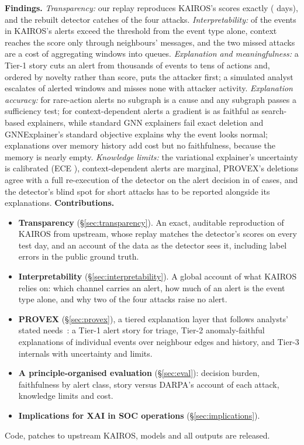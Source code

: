 \documentclass[conference]{IEEEtran}
\begin{document}
\textbf{Findings.} \emph{Transparency:} our replay reproduces KAIROS's scores exactly
(\ParityDaysOK{} days), and the rebuilt detector catches \NumAttacksDetected{} of the four attacks.
\emph{Interpretability:} \FracPriorEvents{} of the events in KAIROS's alerts exceed the threshold from the
event type alone, context reaches the score only through neighbours' messages, and the two missed attacks
are a cost of aggregating windows into queues. \emph{Explanation and meaningfulness:} a Tier-1 story cuts
an alert from thousands of events to tens of actions and, ordered by novelty rather than score, puts the
attacker first; a simulated analyst escalates \TriageWindowsAfter{} of \TriageWindowsBefore{} alerted
windows and misses none with attacker activity. \emph{Explanation accuracy:} for rare-action alerts no
subgraph is a cause and any subgraph passes a sufficiency test; for context-dependent alerts a gradient is
as faithful as search-based explainers, while standard GNN explainers fail exact deletion and
GNNExplainer's standard objective explains why the event looks normal; explanations over memory history add cost but no
faithfulness, because the memory is nearly empty. \emph{Knowledge limits:} the variational explainer's
uncertainty is calibrated (ECE \CalECE{}), context-dependent alerts are marginal, PROVEX's deletions agree
with a full re-execution of the detector on the alert decision in \EsevenFlipAgree{} of cases, and the
detector's blind spot for short attacks has to be reported alongside its explanations.
\textbf{Contributions.}
\begin{itemize}
\item \textbf{Transparency} (\S\ref{sec:transparency}). An exact, auditable reproduction of KAIROS from
  upstream, whose replay matches the detector's scores on every test day, and an account of the data as
  the detector sees it, including label errors in the public ground truth.
\item \textbf{Interpretability} (\S\ref{sec:interpretability}). A global account of what KAIROS relies on:
  which channel carries an alert, how much of an alert is the event type alone, and why two of the four
  attacks raise no alert.
\item \textbf{PROVEX} (\S\ref{sec:provex}), a tiered explanation layer that follows analysts' stated
  needs~\cite{tmt}: a Tier-1 alert story for triage, Tier-2 anomaly-faithful explanations of
  individual events over neighbour edges and history, and Tier-3 internals with uncertainty and limits.
\item \textbf{A principle-organised evaluation} (\S\ref{sec:eval}): decision burden, faithfulness by alert
  class, story versus DARPA's account of each attack, knowledge limits and cost.
\item \textbf{Implications for XAI in SOC operations} (\S\ref{sec:implications}).
\end{itemize}
Code, patches to upstream KAIROS, models and all outputs are released.
\end{document}
